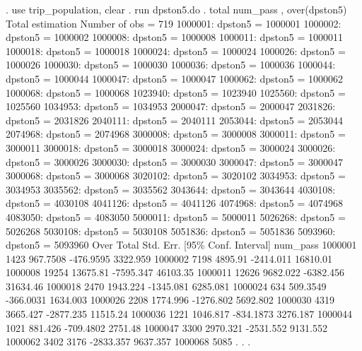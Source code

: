 . use trip_population, clear
{\smallskip}
. run dpston5.do
{\smallskip}
. total num_pass , over(dpston5)
{\smallskip}
Total estimation                  Number of obs   =        719
{\smallskip}
      1000001: dpston5 = 1000001
      1000002: dpston5 = 1000002
      1000008: dpston5 = 1000008
      1000011: dpston5 = 1000011
      1000018: dpston5 = 1000018
      1000024: dpston5 = 1000024
      1000026: dpston5 = 1000026
      1000030: dpston5 = 1000030
      1000036: dpston5 = 1000036
      1000044: dpston5 = 1000044
      1000047: dpston5 = 1000047
      1000062: dpston5 = 1000062
      1000068: dpston5 = 1000068
      1023940: dpston5 = 1023940
      1025560: dpston5 = 1025560
      1034953: dpston5 = 1034953
      2000047: dpston5 = 2000047
      2031826: dpston5 = 2031826
      2040111: dpston5 = 2040111
      2053044: dpston5 = 2053044
      2074968: dpston5 = 2074968
      3000008: dpston5 = 3000008
      3000011: dpston5 = 3000011
      3000018: dpston5 = 3000018
      3000024: dpston5 = 3000024
      3000026: dpston5 = 3000026
      3000030: dpston5 = 3000030
      3000047: dpston5 = 3000047
      3000068: dpston5 = 3000068
      3020102: dpston5 = 3020102
      3034953: dpston5 = 3034953
      3035562: dpston5 = 3035562
      3043644: dpston5 = 3043644
      4030108: dpston5 = 4030108
      4041126: dpston5 = 4041126
      4074968: dpston5 = 4074968
      4083050: dpston5 = 4083050
      5000011: dpston5 = 5000011
      5026268: dpston5 = 5026268
      5030108: dpston5 = 5030108
      5051836: dpston5 = 5051836
      5093960: dpston5 = 5093960
{\smallskip}
        Over {\VBAR}      Total   Std. Err.     [95\% Conf. Interval]
num_pass     {\VBAR}
     1000001 {\VBAR}       1423   967.7508     -476.9595    3322.959
     1000002 {\VBAR}       7198    4895.91     -2414.011    16810.01
     1000008 {\VBAR}      19254   13675.81     -7595.347    46103.35
     1000011 {\VBAR}      12626   9682.022     -6382.456    31634.46
     1000018 {\VBAR}       2470   1943.224     -1345.081    6285.081
     1000024 {\VBAR}        634   509.3549     -366.0031    1634.003
     1000026 {\VBAR}       2208   1774.996     -1276.802    5692.802
     1000030 {\VBAR}       4319   3665.427     -2877.235    11515.24
     1000036 {\VBAR}       1221   1046.817     -834.1873    3276.187
     1000044 {\VBAR}       1021    881.426     -709.4802     2751.48
     1000047 {\VBAR}       3300   2970.321     -2531.552    9131.552
     1000062 {\VBAR}       3402       3176     -2833.357    9637.357
     1000068 {\VBAR}       5085          .             .           .
